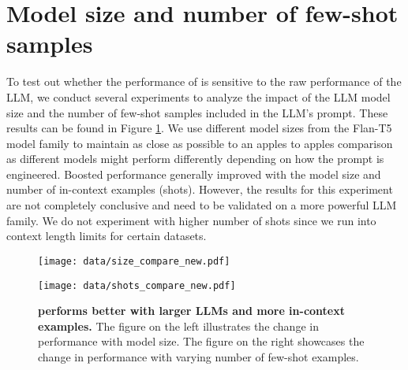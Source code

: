 \section{Model size and number of few-shot samples}
\label{llm_ablations}
To test out whether the performance of \methodname is sensitive to the raw performance of the LLM, we conduct several experiments to analyze the impact of the LLM model size and the number of few-shot samples included in the LLM's prompt. These results can be found in Figure \ref{fig:llm_ablations}. We use different model sizes from the Flan-T5 model family to maintain as close as possible to an apples to apples comparison as different models might perform differently depending on how the prompt is engineered. Boosted performance generally improved with the model size and number of in-context examples (shots). However, the results for this experiment are not completely conclusive and need to be validated on a more powerful LLM family. We do not experiment with higher number of shots since we run into context length limits for certain datasets.


\begin{figure}[H]
    \centering
    \begin{minipage}{0.49\textwidth}
        \centering
        \texttt{[image: data/size\_compare\_new.pdf]}
    \end{minipage}
    \hfill
    \begin{minipage}{0.49\textwidth}
        \centering
        \texttt{[image: data/shots\_compare\_new.pdf]}
    \end{minipage}
    \caption{\textbf{\methodname performs better with larger LLMs and more in-context examples.} The figure on the left illustrates the change in \methodname performance with model size. The figure on the right showcases the change in \methodname performance with varying number of few-shot examples.}
    \label{fig:llm_ablations}
\end{figure}